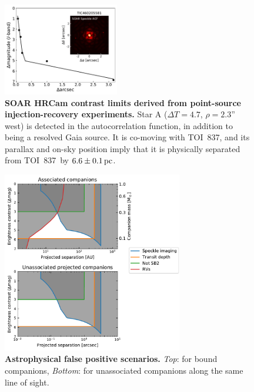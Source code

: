 \documentclass[12pt,twocolumn,tighten]{aastex62}
\newcommand{\tn}{TOI~837} %
\begin{document}
\begin{figure}[t]
	\begin{center}
		\leavevmode
		\includegraphics[width=0.45\textwidth]{f4.pdf}
	\end{center}
	\vspace{-0.7cm}
	\caption{ 
		{\bf SOAR HRCam contrast limits derived from point-source
			injection-recovery experiments.} 
      Star A ($\Delta T=4.7$, $\rho=2.3$'' west) is detected in the
      autocorrelation function, in addition to being a resolved Gaia
      source.
      It is co-moving with \tn, and
      its parallax and on-sky position imply that
      it is physically separated from \tn\ by $6.6\pm 0.1\,{\rm pc}$.
		\label{fig:soar}
	}
\end{figure}

\begin{figure}[t!]
	\begin{center}
		\leavevmode
		\includegraphics[width=0.7\textwidth]{f10.pdf}
	\end{center}
	\vspace{-0.7cm}
	\caption{
    {\bf Astrophysical false positive scenarios.}
		{\it Top}: for bound companions,
    {\it Bottom}: for unassociated companions along the same line of
    sight.
		\label{fig:rawzoom}
	}
\end{figure}
\end{document}
